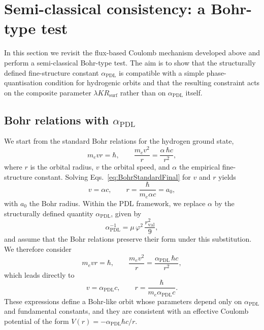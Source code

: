\documentclass[11pt,a4paper]{article}
\begin{document}
\section{Semi-classical consistency: a Bohr-type test}
\label{sec:BohrTest}

In this section we revisit the flux-based Coulomb mechanism developed above and perform a semi-classical Bohr-type test. The aim is to show that the structurally defined fine-structure constant \(\alpha_{\mathrm{PDL}}\) is compatible with a simple phase-quantisation condition for hydrogenic orbits and that the resulting constraint acts on the composite parameter \(\lambda K R_{\mathrm{surf}}\) rather than on \(\alpha_{\mathrm{PDL}}\) itself.

\subsection{Bohr relations with \texorpdfstring{\(\alpha_{\mathrm{PDL}}\)}{alpha\_PDL}}

We start from the standard Bohr relations for the hydrogen ground state,
\begin{equation}
m_e v r = \hbar, 
\qquad 
\frac{m_e v^{2}}{r} = \frac{\alpha \,\hbar c}{r^{2}},
\label{eq:BohrStandardFinal}
\end{equation}
where \(r\) is the orbital radius, \(v\) the orbital speed, and \(\alpha\) the empirical fine-structure constant. Solving Eqs.~\eqref{eq:BohrStandardFinal} for \(v\) and \(r\) yields
\begin{equation}
v = \alpha c, 
\qquad 
r = \frac{\hbar}{m_e \alpha c} = a_0,
\end{equation}
with \(a_0\) the Bohr radius. Within the PDL framework, we replace \(\alpha\) by the structurally defined quantity \(\alpha_{\mathrm{PDL}}\), given by
\begin{equation}
\alpha_{\mathrm{PDL}}^{-1} = \mu \,\varphi^{2}\,\frac{r_{\mathrm{val}}^{2}}{9},
\end{equation}
and assume that the Bohr relations preserve their form under this substitution. We therefore consider
\begin{equation}
m_e v r = \hbar, 
\qquad 
\frac{m_e v^{2}}{r} = \frac{\alpha_{\mathrm{PDL}} \,\hbar c}{r^{2}},
\label{eq:BohrPDLFinal}
\end{equation}
which leads directly to
\begin{equation}
v = \alpha_{\mathrm{PDL}} c, 
\qquad 
r = \frac{\hbar}{m_e \alpha_{\mathrm{PDL}} c}.
\label{eq:BohrSolutionsPDLFinal}
\end{equation}
These expressions define a Bohr-like orbit whose parameters depend only on \(\alpha_{\mathrm{PDL}}\) and fundamental constants, and they are consistent with an effective Coulomb potential of the form \(V(r) = -\alpha_{\mathrm{PDL}} \hbar c / r\).
\end{document}
